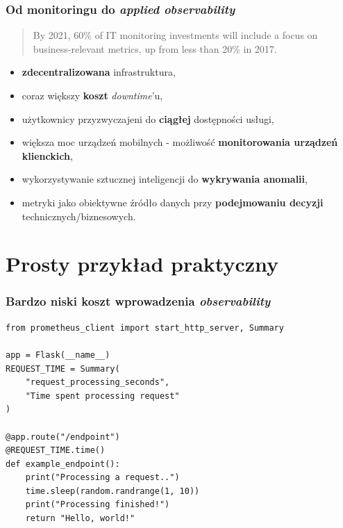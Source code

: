 \documentclass[]{beamer}
\begin{document}
\begin{frame}
  \frametitle{Od monitoringu do \textit{applied observability}}

  \begin{quote}
    By 2021, 60\% of IT monitoring investments will include a focus on business-relevant metrics, up from less than 20\% in 2017.
    \cite{gartner2}
  \end{quote}

  \begin{itemize}
    \item \textbf{zdecentralizowana} infrastruktura,
    \item coraz większy \textbf{koszt} \textit{downtime}'u,
    \item użytkownicy przyzwyczajeni do \textbf{ciągłej} dostępności usługi,
    \item większa moc urządzeń mobilnych - możliwość \textbf{monitorowania urządzeń klienckich},
    \item wykorzystywanie sztucznej inteligencji do \textbf{wykrywania anomalii},
    \item metryki jako obiektywne źródło danych przy \textbf{podejmowaniu decyzji} technicznych/biznesowych.
  \end{itemize}
\end{frame}

\section{Prosty przykład praktyczny}

\begin{frame}[fragile]
  \frametitle{Bardzo niski koszt wprowadzenia \textit{observability}}

  \vspace{-0.2cm}
  \begin{verbatim}
from prometheus_client import start_http_server, Summary

app = Flask(__name__)
REQUEST_TIME = Summary(
    "request_processing_seconds",
    "Time spent processing request"
)

@app.route("/endpoint")
@REQUEST_TIME.time()
def example_endpoint():
    print("Processing a request..")
    time.sleep(random.randrange(1, 10))
    print("Processing finished!")
    return "Hello, world!"
  \end{verbatim}
\end{frame}
\end{document}

